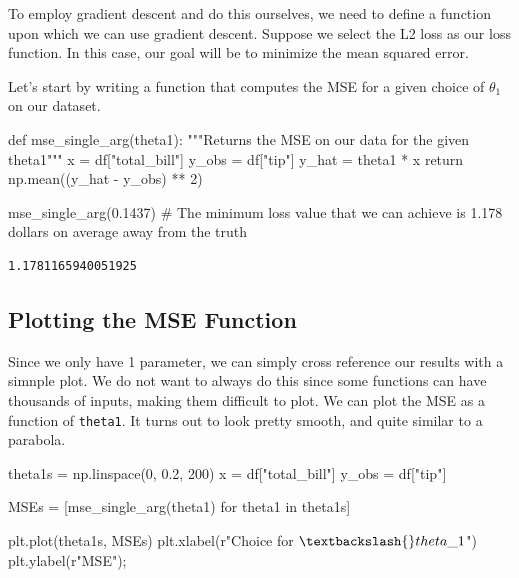\documentclass[
  letterpaper,
  DIV=11,
  numbers=noendperiod]{scrreprt}
\newenvironment{Shaded}{\begin{snugshade}}{\end{snugshade}}
\newcommand{\CommentTok}[1]{\textcolor[rgb]{0.37,0.37,0.37}{#1}}
\newcommand{\ControlFlowTok}[1]{\textcolor[rgb]{0.00,0.23,0.31}{#1}}
\newcommand{\DecValTok}[1]{\textcolor[rgb]{0.68,0.00,0.00}{#1}}
\newcommand{\FloatTok}[1]{\textcolor[rgb]{0.68,0.00,0.00}{#1}}
\newcommand{\KeywordTok}[1]{\textcolor[rgb]{0.00,0.23,0.31}{#1}}
\newcommand{\NormalTok}[1]{\textcolor[rgb]{0.00,0.23,0.31}{#1}}
\newcommand{\OperatorTok}[1]{\textcolor[rgb]{0.37,0.37,0.37}{#1}}
\newcommand{\StringTok}[1]{\textcolor[rgb]{0.13,0.47,0.30}{#1}}
\newcommand{\VerbatimStringTok}[1]{\textcolor[rgb]{0.13,0.47,0.30}{#1}}
\begin{document}
To employ gradient descent and do this ourselves, we need to define a
function upon which we can use gradient descent. Suppose we select the
L2 loss as our loss function. In this case, our goal will be to minimize
the mean squared error.

Let's start by writing a function that computes the MSE for a given
choice of \(\theta_1\) on our dataset.

\begin{Shaded}
\begin{Highlighting}[]
\KeywordTok{def}\NormalTok{ mse\_single\_arg(theta1):}
    \CommentTok{"""Returns the MSE on our data for the given theta1"""}
\NormalTok{    x }\OperatorTok{=}\NormalTok{ df[}\StringTok{"total\_bill"}\NormalTok{]}
\NormalTok{    y\_obs }\OperatorTok{=}\NormalTok{ df[}\StringTok{"tip"}\NormalTok{]}
\NormalTok{    y\_hat }\OperatorTok{=}\NormalTok{ theta1 }\OperatorTok{*}\NormalTok{ x}
    \ControlFlowTok{return}\NormalTok{ np.mean((y\_hat }\OperatorTok{{-}}\NormalTok{ y\_obs) }\OperatorTok{**} \DecValTok{2}\NormalTok{)}

\NormalTok{mse\_single\_arg(}\FloatTok{0.1437}\NormalTok{)}
\CommentTok{\# The minimum loss value that we can achieve is 1.178 dollars on average away from the truth}
\end{Highlighting}
\end{Shaded}

\begin{verbatim}
1.1781165940051925
\end{verbatim}

\hypertarget{plotting-the-mse-function}{%
\subsection{Plotting the MSE Function}\label{plotting-the-mse-function}}

Since we only have 1 parameter, we can simply cross reference our
results with a simnple plot. We do not want to always do this since some
functions can have thousands of inputs, making them difficult to plot.
We can plot the MSE as a function of \texttt{theta1}. It turns out to
look pretty smooth, and quite similar to a parabola.

\begin{Shaded}
\begin{Highlighting}[]
\NormalTok{theta1s }\OperatorTok{=}\NormalTok{ np.linspace(}\DecValTok{0}\NormalTok{, }\FloatTok{0.2}\NormalTok{, }\DecValTok{200}\NormalTok{)}
\NormalTok{x }\OperatorTok{=}\NormalTok{ df[}\StringTok{"total\_bill"}\NormalTok{]}
\NormalTok{y\_obs }\OperatorTok{=}\NormalTok{ df[}\StringTok{"tip"}\NormalTok{]}

\NormalTok{MSEs }\OperatorTok{=}\NormalTok{ [mse\_single\_arg(theta1) }\ControlFlowTok{for}\NormalTok{ theta1 }\KeywordTok{in}\NormalTok{ theta1s]}

\NormalTok{plt.plot(theta1s, MSEs)}
\NormalTok{plt.xlabel(}\VerbatimStringTok{r"Choice for $\textbackslash{}theta\_1$"}\NormalTok{)}
\NormalTok{plt.ylabel(}\VerbatimStringTok{r"MSE"}\NormalTok{)}\OperatorTok{;}
\end{Highlighting}
\end{Shaded}
\end{document}
